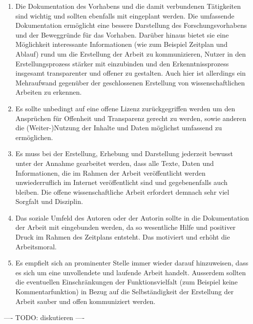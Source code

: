 \begin{enumerate}
\item Die Dokumentation des Vorhabens und die damit verbundenen Tätigkeiten sind wichtig und  sollten ebenfalls mit eingeplant werden. Die umfassende Dokumentation ermöglicht eine bessere Darstellung des Forschungsvorhabens und der Beweggründe für das Vorhaben. Darüber hinaus bietet sie eine Möglichkeit interessante Informationen (wie zum Beispiel Zeitplan und Ablauf) rund um die Erstellung der Arbeit zu kommunizieren, Nutzer in den Erstellungsprozess stärker mit einzubinden und den Erkenntnissprozess insgesamt transparenter und offener zu gestalten. Auch hier ist allerdings ein Mehraufwand gegenüber der geschlossenen Erstellung von wissenschaftlichen Arbeiten zu erkennen.
\item Es sollte unbedingt auf eine offene Lizenz zurückgegriffen werden um den Ansprüchen für Offenheit und Transparenz gerecht zu werden, sowie anderen die (Weiter-)Nutzung der Inhalte und Daten möglichst umfassend zu ermöglichen.
\item Es muss bei der Erstellung, Erhebung und Darstellung jederzeit bewusst unter der Annahme gearbeitet werden, dass alle Texte, Daten und Informationen, die im Rahmen der Arbeit veröffentlicht werden unwiederruflich im Internet veröffentlicht sind und gegebenenfalls auch bleiben. Die offene wissenschaftliche Arbeit erfordert demnach sehr viel Sorgfalt und Disziplin.
\item Das soziale Umfeld des Autoren oder der Autorin sollte in die Dokumentation der Arbeit mit eingebunden werden, da so wesentliche Hilfe und positiver Druck im Rahmen des Zeitplans entsteht. Das motiviert und erhöht die Arbeitsmoral.
\item Es empfielt sich an prominenter Stelle immer wieder darauf hinzuweisen, dass es sich um eine unvollendete und laufende Arbeit handelt. Ausserdem sollten die eventuellen Einschränkungen der Funktionsvielfalt (zum Beispiel keine Kommentarfunktion) in Bezug auf die Selbständigkeit der Erstellung der Arbeit sauber und offen kommuniziert werden.
\end{enumerate}

---- TODO: diskutieren ----
